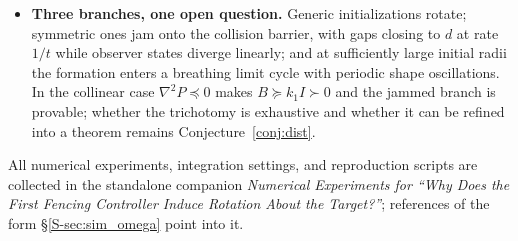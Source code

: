 \begin{itemize}[leftmargin=1.6em,itemsep=0.35em]
  \item \textbf{Three branches, one open question.} Generic initializations rotate; symmetric ones
        jam onto the collision barrier, with gaps closing to $d$ at rate $1/t$ while observer states
        diverge linearly; and at sufficiently large initial radii the formation enters a breathing
        limit cycle with periodic shape oscillations. In the collinear case $\nabla^2P\preceq0$ makes
        $B\succeq k_1I\succ0$ and the jammed branch is provable; whether the trichotomy is exhaustive
        and whether it can be refined into a theorem remains
        Conjecture~\ref{conj:dist}.
\end{itemize}

\noindent
All numerical experiments, integration settings, and reproduction scripts are collected in the
standalone companion \emph{Numerical Experiments for ``Why Does the First Fencing Controller Induce
Rotation About the Target?''}; references of the form \S\ref{S-sec:sim_omega} point into it.
